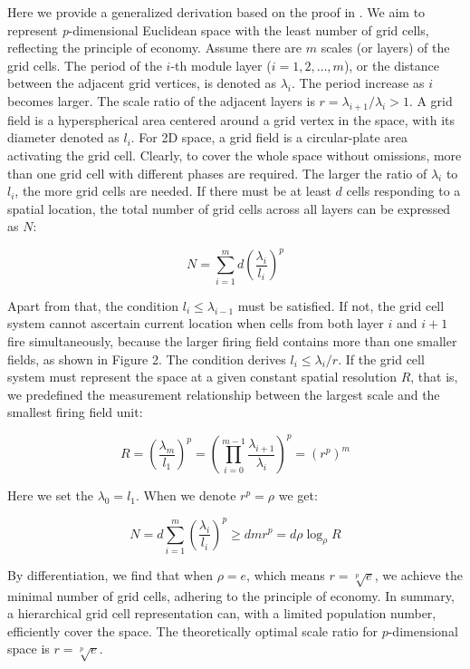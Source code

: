 \documentclass[letterpaper]{article} %
\begin{document}
Here we provide a generalized derivation based on the proof in \cite{wei2015principle}. We aim to represent \emph{p}-dimensional Euclidean space with the least number of grid cells, reflecting the principle of economy. Assume there are \(m\) scales (or layers) of the grid cells. The period of the \(i\)-th module layer (\(i=1,2,\ldots,m\)), or the distance between the adjacent grid vertices, is denoted as \(\lambda_i\). The period increase as $i$ becomes larger. The scale ratio of the adjacent layers is \(r = \lambda_{i+1}/\lambda_{i} > 1\). A grid field is a hyperspherical area centered around a grid vertex in the space, with its diameter denoted as \(l_i\). For 2D space, a grid field is a circular-plate area activating the grid cell. Clearly, to cover the whole space without omissions, more than one grid cell with different phases are required. The larger the ratio of \(\lambda_i\) to \(l_i\), the more grid cells are needed. If there must be at least \(d\) cells responding to a spatial location, the total number of grid cells across all layers can be expressed as $N$:

\begin{equation}
    N = \sum_{i=1}^{m} d \left( \frac{\lambda_i}{l_i} \right)^p
\end{equation}

Apart from that, the condition $l_{i} \le \lambda_{i-1}$ must be satisfied. If not, the grid cell system cannot ascertain current location when cells from both layer $i$ and $i+1$ fire simultaneously, because the larger firing field contains more than one smaller fields, as shown in Figure 2. The condition derives $l_{i} \le \lambda_{i} / r$. If the grid cell system must represent the space at a given constant spatial resolution $R$, that is, we predefined the measurement relationship between the largest scale and the smallest firing field unit:

\begin{equation}
R = \left(\frac{\lambda_m}{l_1}\right)^p 
  = \left(\prod_{i=0}^{m-1} \frac{\lambda_{i+1}}{\lambda_i}\right)^p 
  = \left(r^p\right)^m
\end{equation}

Here we set the $\lambda_0 = l_1$. When we denote $r^p = \rho$ we get:

\begin{equation}
N = d \sum_{i=1}^{m} \left( \frac{\lambda_i}{l_i} \right)^p \ge dmr^p 
  = d \rho \log_\rho R
\end{equation}

By differentiation, we find that when \(\rho = e\), which means \(r = \sqrt[p]{e}\), we achieve the minimal number of grid cells, adhering to the principle of economy. In summary, a hierarchical grid cell representation can, with a limited population number, efficiently cover the space. The theoretically optimal scale ratio for \(p\)-dimensional space is \(r = \sqrt[p]{e}\).
\end{document}
